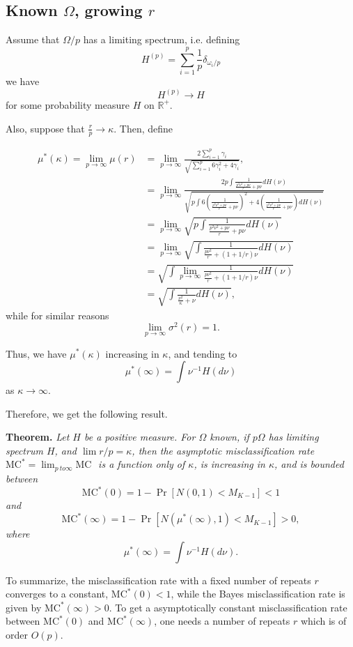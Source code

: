 \documentclass[12pt]{article}
\begin{document}
\subsection{Known $\Omega$, growing $r$}

Assume that $\Omega/p$ has a limiting spectrum, i.e.
defining
\[
H^{(p)} = \sum_{i=1}^p \frac{1}{p}\delta_{\omega_i/p}
\]
we have
\[
H^{(p)} \to H
\]
for some probability measure $H$ on $\mathbb{R}^+$.

Also, suppose that $\frac{r}{p} \to \kappa$.
Then, define

\begin{align*}
\mu^*(\kappa) = \lim_{p \to \infty} \mu(r) &= \lim_{p \to \infty} \frac{2\sum_{i=1}^p \gamma_i}{\sqrt{\sum_{i=1}^p 6\gamma_i^2 + 4 \gamma_i}},
\\&= \lim_{p \to \infty} \frac{2p \int \frac{1}{\frac{p^2 \nu^2 + p\nu}{r} + p\nu}dH(\nu)}{
\sqrt{
p\int 6\left(\frac{1}{\frac{p^2 \nu^2 + p\nu}{r} + p\nu}\right)^2 + 4 \left(\frac{1}{\frac{p^2 \nu^2 + p\nu}{r} + p\nu}\right)dH(\nu)
}
}
\\&= \lim_{p \to \infty} \sqrt{p \int \frac{1}{\frac{p^2 \nu^2 + p\nu}{r} + p\nu}dH(\nu)}
\\&= \lim_{p \to \infty} \sqrt{\int \frac{1}{\frac{p \nu^2}{r} + (1 + 1/r)\nu}dH(\nu)}
\\&= \sqrt{\int \lim_{p \to \infty} \frac{1}{\frac{p \nu^2}{r} + (1 + 1/r)\nu}dH(\nu)}
\\&= \sqrt{\int \frac{1}{\frac{\nu^2}{\kappa} + \nu} dH(\nu)},
\end{align*}
while for similar reasons
\[
\lim_{p \to \infty} \sigma^2(r) = 1.
\]

Thus, we have $\mu^*(\kappa)$ increasing in $\kappa$, and tending to
\[
\mu^*(\infty) = \int \nu^{-1} H(d\nu)
\]
as $\kappa \to \infty$.

Therefore, we get the following result.

\textbf{Theorem. }\emph{
Let $H$ be a positive measure.
For $\Omega$ known, if $p\Omega$ has limiting spectrum $H$, and $\lim r/p = \kappa$, then
the asymptotic misclassification rate $\text{MC}^* = \lim_{p\ to \infty} \text{MC }$ is a function only of $\kappa$,
is increasing in $\kappa$,
and is bounded between
\[
\text{MC}^*(0) = 1 - \Pr[N(0, 1) < M_{K-1}] < 1
\]
and
\[
\text{MC}^*(\infty) = 1-\Pr[N(\mu^*(\infty), 1) < M_{K-1}] > 0,
\]
where
\[
\mu^*(\infty) = \int \nu^{-1} H(d\nu).
\]
}

To summarize, the misclassification rate with a fixed number of repeats $r$ converges to a constant, $\text{MC}^*(0) < 1$,
while the Bayes misclassification rate is given by $\text{MC}^*(\infty) > 0$.
To get a asymptotically constant misclassification rate between $\text{MC}^*(0)$ and $\text{MC}^*(\infty)$, one needs
a number of repeats $r$ which is of order $O(p)$.
\end{document}
